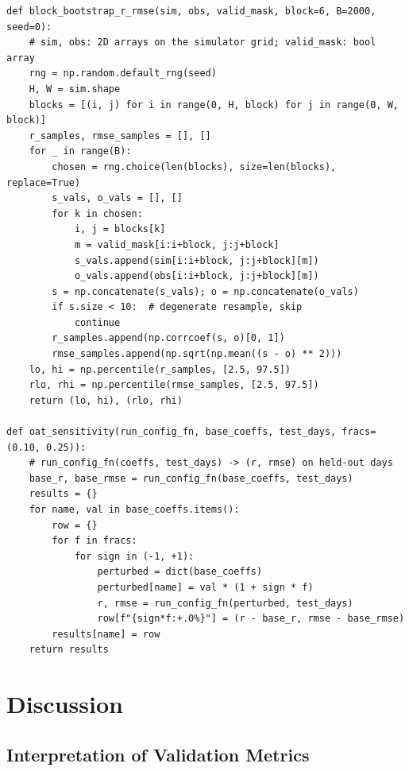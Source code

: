 \documentclass[12pt, letterpaper]{article}
\begin{document}
\begin{table}[ht]
\centering
\caption{Reference bootstrap/sensitivity procedure (Python/NumPy/SciPy pseudocode),
provided so the analysis is reproducible from the released per-cell arrays.}
\label{lst:bootstrap}
\small
\begin{verbatim}
def block_bootstrap_r_rmse(sim, obs, valid_mask, block=6, B=2000, seed=0):
    # sim, obs: 2D arrays on the simulator grid; valid_mask: bool array
    rng = np.random.default_rng(seed)
    H, W = sim.shape
    blocks = [(i, j) for i in range(0, H, block) for j in range(0, W, block)]
    r_samples, rmse_samples = [], []
    for _ in range(B):
        chosen = rng.choice(len(blocks), size=len(blocks), replace=True)
        s_vals, o_vals = [], []
        for k in chosen:
            i, j = blocks[k]
            m = valid_mask[i:i+block, j:j+block]
            s_vals.append(sim[i:i+block, j:j+block][m])
            o_vals.append(obs[i:i+block, j:j+block][m])
        s = np.concatenate(s_vals); o = np.concatenate(o_vals)
        if s.size < 10:  # degenerate resample, skip
            continue
        r_samples.append(np.corrcoef(s, o)[0, 1])
        rmse_samples.append(np.sqrt(np.mean((s - o) ** 2)))
    lo, hi = np.percentile(r_samples, [2.5, 97.5])
    rlo, rhi = np.percentile(rmse_samples, [2.5, 97.5])
    return (lo, hi), (rlo, rhi)

def oat_sensitivity(run_config_fn, base_coeffs, test_days, fracs=(0.10, 0.25)):
    # run_config_fn(coeffs, test_days) -> (r, rmse) on held-out days
    base_r, base_rmse = run_config_fn(base_coeffs, test_days)
    results = {}
    for name, val in base_coeffs.items():
        row = {}
        for f in fracs:
            for sign in (-1, +1):
                perturbed = dict(base_coeffs)
                perturbed[name] = val * (1 + sign * f)
                r, rmse = run_config_fn(perturbed, test_days)
                row[f"{sign*f:+.0%}"] = (r - base_r, rmse - base_rmse)
        results[name] = row
    return results
\end{verbatim}
\end{table}

\section{Discussion}
\label{sec:discussion}

\subsection{Interpretation of Validation Metrics}
\end{document}
